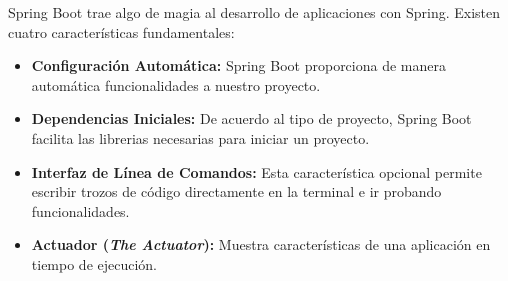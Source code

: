 			Spring Boot trae algo de magia al desarrollo de aplicaciones con Spring.
			Existen cuatro características fundamentales:
			
			\begin{itemize}
			  \item {\bf Configuración Automática:} {Spring Boot proporciona de manera
			  automática funcionalidades a nuestro proyecto.}
			  
			  \item {\bf Dependencias Iniciales:} {De acuerdo al tipo de proyecto, Spring
			  Boot facilita las librerias necesarias para iniciar un proyecto.}
			  
			  \item {\bf Interfaz de Línea de Comandos:} {Esta característica opcional
			  permite escribir trozos de código directamente en la terminal e ir
			  probando funcionalidades.}
			  
			  \item {\bf Actuador (\textit{The Actuator}):} {Muestra características de
			  una aplicación en tiempo de ejecución.}
			\end{itemize}
			
		
		
		
		
		
		
		
		
